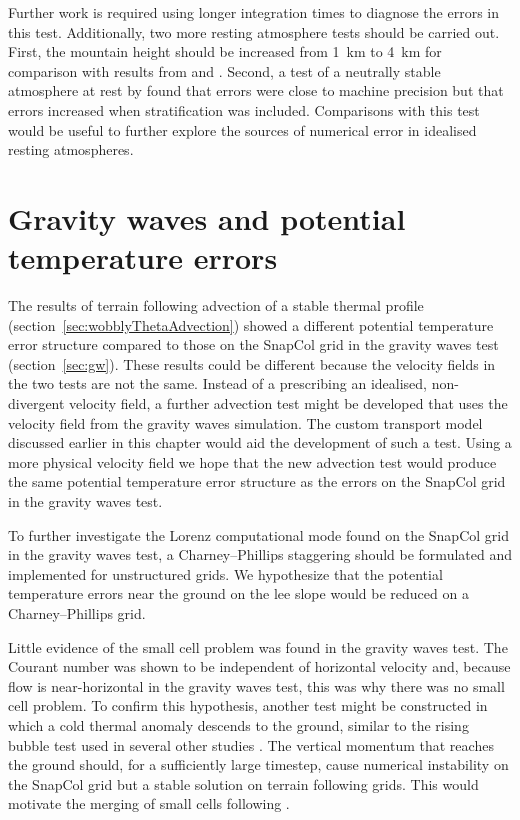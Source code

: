 Further work is required using longer integration times to diagnose the errors in this test.  Additionally, two more resting atmosphere tests should be carried out.  First, the mountain height should be increased from \SI{1}{\kilo\meter} to \SI{4}{\kilo\meter} for comparison with results from \textcite{zaengl2012} and \textcite{good2013}.  Second, a test of a neutrally stable atmosphere at rest by \textcite{botta2004} found that errors were close to machine precision but that errors increased when stratification was included.  Comparisons with this test would be useful to further explore the sources of numerical error in idealised resting atmospheres.

\section{Gravity waves and potential temperature errors}
\label{sec:further-work:gw}

The results of terrain following advection of a stable thermal profile (section~\ref{sec:wobblyThetaAdvection}) showed a different potential temperature error structure compared to those on the SnapCol grid in the gravity waves test (section~\ref{sec:gw}).  These results could be different because the velocity fields in the two tests are not the same.  Instead of a prescribing an idealised, non-divergent velocity field, a further advection test might be developed that uses the velocity field from the gravity waves simulation.  The custom transport model discussed earlier in this chapter would aid the development of such a test.  Using a more physical velocity field we hope that the new advection test would produce the same potential temperature error structure as the errors on the SnapCol grid in the gravity waves test.

To further investigate the Lorenz computational mode found on the SnapCol grid in the gravity waves test, a Charney--Phillips staggering should be formulated and implemented for unstructured grids.  We hypothesize that the potential temperature errors near the ground on the lee slope would be reduced on a Charney--Phillips grid.

Little evidence of the small cell problem was found in the gravity waves test.  The Courant number was shown to be independent of horizontal velocity and, because flow is near-horizontal in the gravity waves test, this was why there was no small cell problem.  To confirm this hypothesis, another test might be constructed in which a cold thermal anomaly descends to the ground, similar to the rising bubble test used in several other studies \parencites{bonaventura2000}{jebens2011}{good2013}.  The vertical momentum that reaches the ground should, for a sufficiently large timestep, cause numerical instability on the SnapCol grid but a stable solution on terrain following grids.  This would motivate the merging of small cells following \textcite{yamazaki-satomura2010}.


